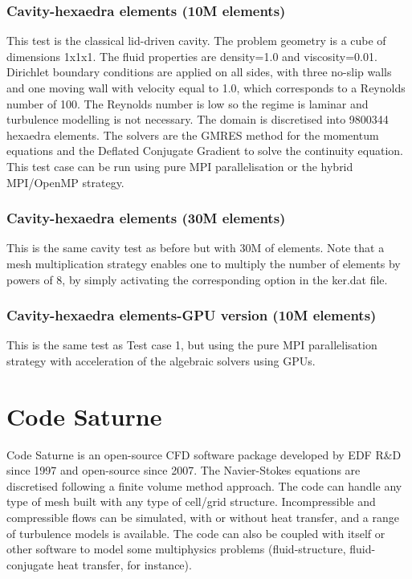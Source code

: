\subsubsection{Cavity-hexaedra elements (10M elements)}
This test is the classical lid-driven cavity. The problem geometry is a cube of dimensions 1x1x1. The fluid properties are density=1.0 and viscosity=0.01. Dirichlet boundary conditions are applied on all sides, with three no-slip walls and one moving wall with velocity equal to 1.0, which corresponds to a Reynolds number of 100. The Reynolds number is low so the regime is laminar and turbulence modelling is not necessary. The domain is discretised into 9800344 hexaedra elements. The solvers are the GMRES method for the momentum equations and the Deflated Conjugate Gradient to solve the continuity equation. This test case can be run using pure MPI parallelisation or the hybrid MPI/OpenMP strategy.

\subsubsection{Cavity-hexaedra elements (30M elements)}
This is the same cavity test as before but with 30M of elements. Note that a mesh multiplication strategy enables one to multiply the number of elements by powers of 8, by simply activating the corresponding option in the ker.dat file.

\subsubsection{Cavity-hexaedra elements-GPU version (10M elements)}
This is the same test as Test case 1, but using the pure MPI parallelisation strategy with acceleration of the algebraic solvers using GPUs.

\section{Code Saturne}
Code Saturne is an open-source CFD software package developed by EDF R\&D since 1997 and open-source since 2007. The Navier-Stokes equations are discretised following a finite volume method approach. The code can handle any type of mesh built with any type of cell/grid structure. Incompressible and compressible flows can be simulated, with or without heat transfer, and a range of turbulence models is available. The code can also be coupled with itself or other software to model some multiphysics problems (fluid-structure, fluid-conjugate heat transfer, for instance).

